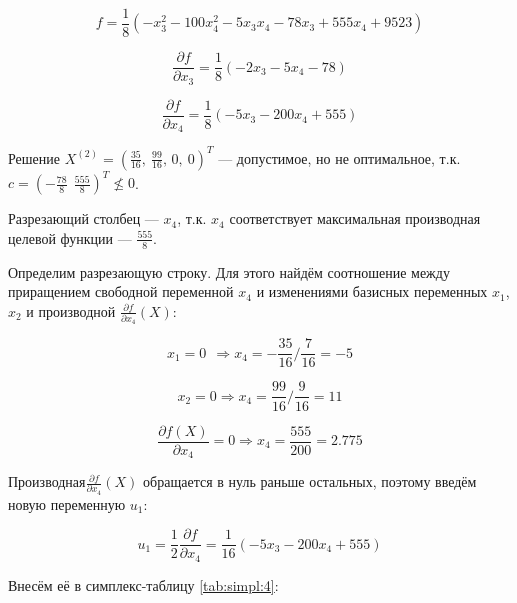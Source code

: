 \begin{equation*}
	f = \frac{1}{8} \left( -x_3^2 - 100 x_4^2 - 5 x_3 x_4 - 78 x_3 + 555 x_4 + 9523 \right)
\end{equation*}

\begin{equation*}
	\frac{\partial f}{\partial x_3} = \frac{1}{8} \left( -2 x_3 - 5 x_4 - 78 \right)
\end{equation*}

\begin{equation*}
	\frac{\partial f}{\partial x_4} = \frac{1}{8} \left( -5 x_3 - 200 x_4 + 555 \right)
\end{equation*}

Решение $X^{(2)} = \left(\frac{35}{16},\ \frac{99}{16} ,\, 0,\ 0\right)^T$ --- допустимое, но не оптимальное, т.к. $c = (-\frac{78}{8}\ \ \frac{555}{8})^T \nleq 0$.

Разрезающий столбец --- $x_4$, т.к. $x_4$ соответствует максимальная производная целевой функции --- $\frac{555}{8}$.

Определим разрезающую строку. Для этого найдём соотношение между приращением свободной переменной $x_4$ и изменениями базисных переменных $x_1$, $x_2$ и производной $\frac{\partial f}{\partial x_4} \left(X \right)$:

\begin{equation*}
	x_1 = 0\ \ \Rightarrow x_4 = -\frac{35}{16} \Big/ \frac{7}{16} = -5
\end{equation*}

\begin{equation*}
	x_2 = 0 \Rightarrow  x_4 = \frac{99}{16} \Big/ \frac{9}{16}= 11
\end{equation*}

\begin{equation*}
	\frac{\partial f(X)}{\partial x_4} = 0 \Rightarrow x_4 = \frac{555}{200} = 2.775
\end{equation*}

Производная$\frac{\partial f}{\partial x_4} \left(X \right)$ обращается в нуль раньше остальных, поэтому введём новую переменную $u_1$:

\begin{equation*}
	u_1 = \frac{1}{2} \frac{\partial f}{\partial x_4} = \frac{1}{16} \left( -5 x_3 - 200 x_4 + 555 \right)
\end{equation*}

Внесём её в симплекс-таблицу \ref{tab:simpl:4}:

